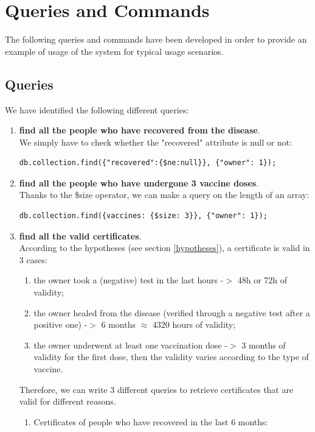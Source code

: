\documentclass{article}
\begin{document}
\section{Queries and Commands}
The following queries and commands have been developed in order to provide an example of usage of the system for typical usage scenarios.
\subsection{Queries}
We have identified the following different queries:
\begin{enumerate}
\item \textbf{find all the people who have recovered from the disease}.\\
We simply have to check whether the "recovered" attribute is null or not:
\begin{lstlisting}
db.collection.find({"recovered":{$ne:null}}, {"owner": 1});
    \end{lstlisting}
    \item \textbf{find all the people who have undergone 3 vaccine doses}.\\
    Thanks to the \$size operator, we can make a query on the length of an array:
    \begin{lstlisting}
db.collection.find({vaccines: {$size: 3}}, {"owner": 1});
    \end{lstlisting}
    \item \textbf{find all the valid certificates}.\\
    According to the hypotheses (see section \ref{hypotheses}), a certificate is valid in 3 cases:
    \begin{enumerate}
        \item the owner took a (negative) test in the last hours -$>$ 48h or 72h of validity;
        \item the owner healed from the disease (verified through a negative test after a positive one) -$>$ 6 months $\approx$ 4320 hours of validity;
        \item the owner underwent at least one vaccination dose -$>$ 3 months of validity for the first dose, then the validity varies according to the type of vaccine.
    \end{enumerate}
    Therefore, we can write 3 different queries to retrieve certificates that are valid for different reasons.\\
    \begin{enumerate}
        \item Certificates of people who have recovered in the last 6 months:

\end{enumerate}
\end{enumerate}
\end{document}
